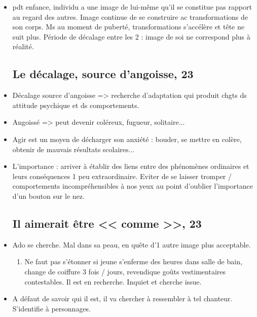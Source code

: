\documentclass[12pt]{report}
\begin{document}
\begin{itemize}
\item pdt enfance, individu a une image de lui-même qu'il se constitue pas rapport au regard des autres. Image continue de se construire ac transformations de son corps. Ms au moment de puberté, transformations s'accélère et tête ne suit plus. Période de décalage entre les 2 : image de soi ne correspond plus à réalité. \\

\subsection{Le décalage, source d'angoisse, 23}

\item Décalage source d'angoisse => recherche d'adaptation qui produit chgts ds attitude psychique et ds comportements. \\

\item Angoissé => peut devenir coléreux, fugueur, solitaire... \\

\item Agir est un moyen de décharger son anxiété : bouder, se mettre en colère, obtenir de mauvais résultats scolaires...\\

\item L'importance : arriver à établir des liens entre des phénomènes ordinaires et leurs conséquences 1 peu extraordinaire. Eviter de se laisser tromper / comportements incompréhensibles à nos yeux au point d'oublier l'importance d'un bouton sur le nez. \\

\subsection{Il aimerait être << comme >>, 23}

\item Ado se cherche. Mal dans sa peau, en quête d'1 autre image plus acceptable.
\begin{enumerate}
\item Ne faut pas s'étonner si jeune s'enferme des heures dans salle de bain, change de coiffure 3 fois / jours, revendique goûts vestimentaires contestables. Il est en recherche. Inquiet et cherche issue.\\
\end{enumerate}

\item A défaut de savoir qui il est, il va chercher à ressembler à tel chanteur. S'identifie à personnages. \\


\end{itemize}
\end{document}
